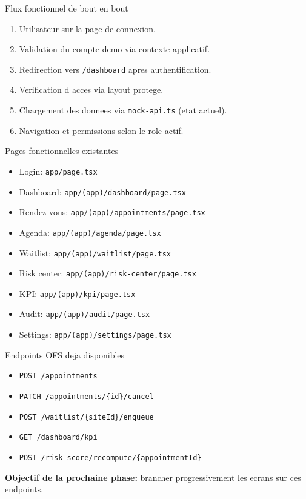 \documentclass[10pt,aspectratio=169]{beamer}
\begin{document}
\begin{frame}{Flux fonctionnel de bout en bout}
  \begin{enumerate}
    \item Utilisateur sur la page de connexion.
    \item Validation du compte demo via contexte applicatif.
    \item Redirection vers \texttt{/dashboard} apres authentification.
    \item Verification d acces via layout protege.
    \item Chargement des donnees via \texttt{mock-api.ts} (etat actuel).
    \item Navigation et permissions selon le role actif.
  \end{enumerate}
\end{frame}

\begin{frame}{Pages fonctionnelles existantes}
  \begin{itemize}
    \item Login: \texttt{app/page.tsx}
    \item Dashboard: \texttt{app/(app)/dashboard/page.tsx}
    \item Rendez-vous: \texttt{app/(app)/appointments/page.tsx}
    \item Agenda: \texttt{app/(app)/agenda/page.tsx}
    \item Waitlist: \texttt{app/(app)/waitlist/page.tsx}
    \item Risk center: \texttt{app/(app)/risk-center/page.tsx}
    \item KPI: \texttt{app/(app)/kpi/page.tsx}
    \item Audit: \texttt{app/(app)/audit/page.tsx}
    \item Settings: \texttt{app/(app)/settings/page.tsx}
  \end{itemize}
\end{frame}

\begin{frame}{Endpoints OFS deja disponibles}
  \begin{itemize}
    \item \texttt{POST /appointments}
    \item \texttt{PATCH /appointments/\{id\}/cancel}
    \item \texttt{POST /waitlist/\{siteId\}/enqueue}
    \item \texttt{GET /dashboard/kpi}
    \item \texttt{POST /risk-score/recompute/\{appointmentId\}}
  \end{itemize}
  \vspace{0.3cm}
  \textbf{Objectif de la prochaine phase:} brancher progressivement les ecrans sur ces endpoints.
\end{frame}
\end{document}
